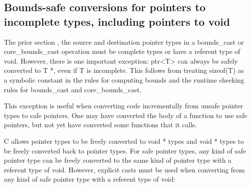 \documentclass[]{article}
\begin{document}
\protect\hypertarget{ux5fToc424307715}{}{}

\subsection{\texorpdfstring{\protect\hypertarget{ux5fToc437460802}{}{\protect\hypertarget{ux5fToc440445483}{}{\protect\hypertarget{ux5fToc440449265}{}{\protect\hypertarget{ux5fToc440551915}{}{\protect\hypertarget{ux5fToc426641112}{}{\protect\hypertarget{ux5fToc435434971}{}{}}}}}}Bounds-safe
conversions for pointers to incomplete types, including pointers to
void}{Bounds-safe conversions for pointers to incomplete types, including pointers to void}}\label{bounds-safe-conversions-for-pointers-to-incomplete-types-including-pointers-to-void}

The prior section , the source and destination pointer types in a
bounds\_cast or core\_bounds\_cast operation must be complete types or
have a referent type of void. However, there is one important exception:
ptr\textless{}T\textgreater{} can always be safely converted to T *,
even if T is incomplete. This follows from treating sizeof(T) as a
symbolic constant in the rules for computing bounds and the runtime
checking rules for bounds\_cast and core\_bounds\_cast.

This exception is useful when converting code incrementally from unsafe
pointer types to safe pointers. One may have converted the body of a
function to use safe pointers, but not yet have converted some functions
that it calls.

C allows pointer types to be freely converted to void * types and void *
types to be freely converted back to pointer types. For safe pointer
types, any kind of safe pointer type can be freely converted to the same
kind of pointer type with a referent type of void. However, explicit
casts must be used when converting from any kind of safe pointer type
with a referent type of void:
\end{document}
